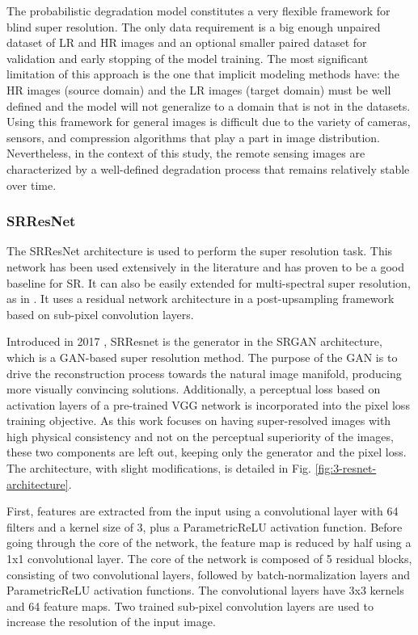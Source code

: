     The probabilistic degradation model constitutes a very flexible framework for blind super resolution. 
    The only data requirement is a big enough unpaired dataset of LR and HR images and an optional smaller paired dataset for validation and early stopping of the model training.
    The most significant limitation of this approach is the one that implicit modeling methods have: the HR images (source domain) and the LR images (target domain) must be well defined and the model will not generalize to a domain that is not in the datasets. 
    Using this framework for general images is difficult due to the variety of cameras, sensors, and compression algorithms that play a part in image distribution. Nevertheless, in the context of this study, the remote sensing images are characterized by a well-defined degradation process that remains relatively stable over time.


\subsubsection{SRResNet}

    
    The SRResNet architecture is used to perform the super resolution task. This network has been used extensively in the literature and has proven to be a good baseline for SR. It can also be easily extended for multi-spectral super resolution, as in \cite{myself2023}. It uses a residual network architecture in a post-upsampling framework based on sub-pixel convolution layers.
    
    Introduced in 2017 \cite{ledig2017photorealistic}, SRResnet is the generator in the SRGAN architecture, which is a GAN-based super resolution method. The purpose of the GAN is to drive the reconstruction process towards the natural image manifold, producing more visually convincing solutions. Additionally, a perceptual loss based on activation layers of a pre-trained VGG network \cite{simonyan2015deep} is incorporated into the pixel loss training objective. As this work focuses on having super-resolved images with high physical consistency and not on the perceptual superiority of the images, these two components are left out,  keeping only the generator and the pixel loss. The architecture, with slight modifications, is detailed in Fig. \ref{fig:3-resnet-architecture}.

    First, features are extracted from the input using a convolutional layer with 64 filters and a kernel size of 3, plus a ParametricReLU activation function.
    Before going through the core of the network, the feature map is reduced by half using a 1x1 convolutional layer.
    The core of the network is composed of 5 residual blocks, consisting of two convolutional layers, followed by batch-normalization layers and ParametricReLU activation functions. 
    The convolutional layers have 3x3 kernels and 64 feature maps. 
    Two trained sub-pixel convolution layers are used to increase the resolution of the input image.

